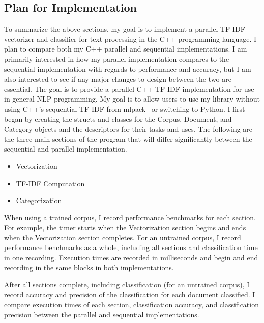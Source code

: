 \documentclass[conference]{IEEEtran}
\begin{document}
\subsection{Plan for Implementation}
To summarize the above sections, my goal is to implement a parallel TF-IDF vectorizer and classifier for text processing in the C++ programming language. I plan to compare both my C++ parallel and sequential implementations. I am primarily interested in how my parallel implementation compares to the sequential implementation with regards to performance and accuracy, but I am also interested to see if any major changes to design between the two are essential. The goal is to provide a parallel C++ TF-IDF implementation for use in general NLP programming. My goal is to allow users to use my library without using C++’s sequential TF-IDF from mlpack~\cite{b3} or switching to Python. I first began by creating the structs and classes for the Corpus, Document, and Category objects and the descriptors for their tasks and uses. The following are the three main sections of the program that will differ significantly between the sequential and parallel implementation.

\begin{itemize}
    \item Vectorization
    \item TF-IDF Computation
    \item Categorization
\end{itemize}

When using a trained corpus, I record performance benchmarks for each section. For example, the timer starts when the Vectorization section begins and ends when the Vectorization section completes. For an untrained corpus, I record performance benchmarks as a whole, including all sections and classification time in one recording. Execution times are recorded in milliseconds and begin and end recording in the same blocks in both implementations.

After all sections complete, including classification (for an untrained corpus), I record accuracy and precision of the classification for each document classified. I compare execution times of each section, classification accuracy, and classification precision between the parallel and sequential implementations. 
\end{document}

